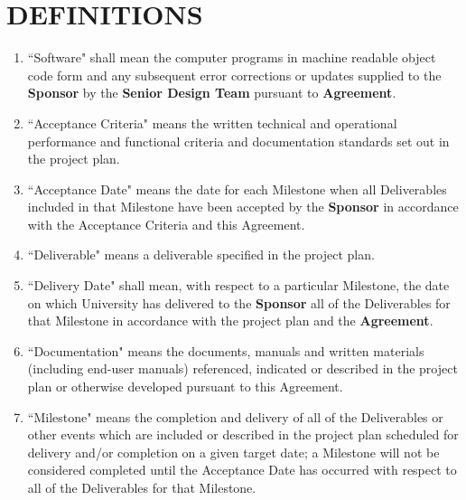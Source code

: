 \documentclass[11pt]{article}
\begin{document}
\section{DEFINITIONS }
\begin{enumerate}  \itemsep4pt \parskip0pt 
\item ``Software" shall mean the computer programs in machine readable       object code form and any subsequent error corrections or updates       supplied to  the \textbf{Sponsor} by  the \textbf{Senior Design Team} pursuant to \textbf{Agreement}.  

\item ``Acceptance Criteria" means the written technical and operational       performance and functional criteria and documentation standards       set out in the project plan.

\item ``Acceptance Date" means the date for each Milestone when all       Deliverables included in that Milestone have been accepted by    the \textbf{Sponsor} in accordance with the Acceptance Criteria and this       Agreement.   

\item  ``Deliverable" means a deliverable specified in the project plan.    

\item  ``Delivery Date" shall mean, with respect to a particular       Milestone, the date on which University has delivered to the \textbf{Sponsor}       all of the Deliverables for that Milestone in accordance with  the project plan and the \textbf{Agreement}.    

\item  ``Documentation" means the documents, manuals and written materials       (including end-user manuals) referenced, indicated or described       in the project plan or otherwise developed pursuant to this       Agreement.    

\item  ``Milestone" means the completion and delivery of all of the       Deliverables or other events which are included or described in       the project plan scheduled for delivery and/or completion on a       given target date; a Milestone will not be considered completed       until the Acceptance Date has occurred with respect to all of the       Deliverables for that Milestone.  
\end{enumerate}
\end{document}
